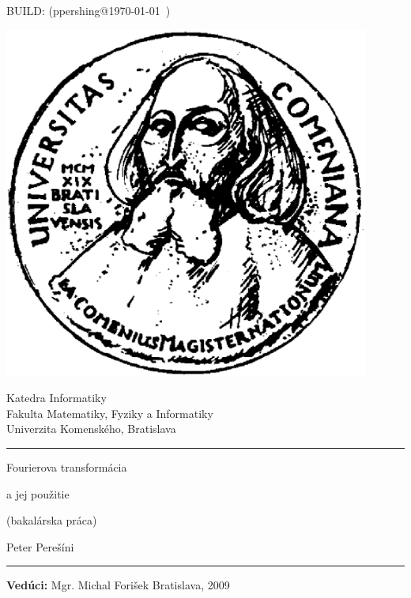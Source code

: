 \documentclass[12pt]{book}
\title{\mytitle}
\author{\myname}
\date{}
\def\mytitleone{Fourierova transformácia}
\def\mytitletwo{a jej použitie}
\def\myname{Peter Perešíni}
\def\myleader{Mgr. Michal Forišek}
\begin{document}
\frontmatter

\thispagestyle{empty}

BUILD: (ppershing@\today~\currenttime)

\begin{minipage}{0.25\textwidth}
\includegraphics[width=0.9\textwidth]{obrazky/komlogo}
\end{minipage}
\begin{minipage}{0.69\textwidth}
\begin{center}
\sc Katedra Informatiky \\
Fakulta Matematiky, Fyziky a Informatiky \\
Univerzita Komenského, Bratislava
\end{center}
\end{minipage}

\vfill
\begin{center}
\begin{minipage}{0.8\textwidth}
\hrule
\bigskip\bigskip
\centerline{\LARGE\sc \mytitleone}
\bigskip
\centerline{\LARGE\sc \mytitletwo}
\smallskip
\centerline{(bakalárska práca)}
\bigskip
\bigskip
\centerline{\large\sc \myname}
\bigskip\bigskip
\hrule
\end{minipage}
\end{center}
\vfill
{\bf Vedúci:} \myleader
\hfill Bratislava, 2009
\eject %

\pagecolor{white}
\thispagestyle{empty}~\vfill\eject %
\end{document}
